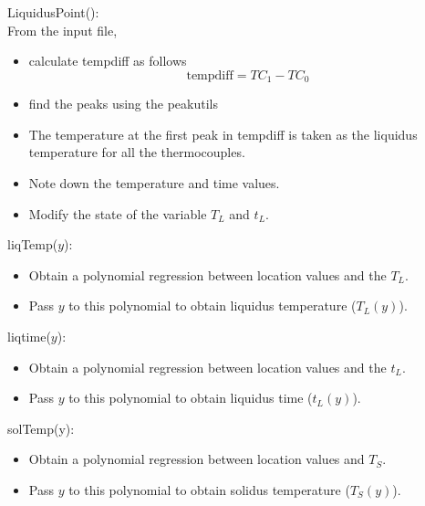 \documentclass[12pt, titlepage]{article}
\begin{document}
\noindent LiquidusPoint():\\

From the input file,        

\begin{itemize}

\item calculate tempdiff as follows
\begin{equation*}
\text{tempdiff} = TC_{1} - TC_{0} 
\end{equation*}
\item find the peaks using the peakutils

\item The temperature at the first peak in tempdiff is taken as the liquidus
  temperature for all the thermocouples. 
\item Note down the temperature and time values. 
\item Modify the state of the variable $T_L$ and $t_L$.\\

\end{itemize}

\noindent liqTemp($y$):
\begin{itemize}
\item Obtain a polynomial regression between location values and the $T_L$.\\
\item Pass $y$ to this polynomial to obtain liquidus temperature ($T_L(y)$).\\
\end{itemize}

\noindent liqtime($y$):
\begin{itemize}
\item Obtain a polynomial regression between location values and the $t_L$.\\
\item Pass $y$ to this polynomial to obtain liquidus time ($t_L(y)$).\\
\end{itemize}

\noindent solTemp(y):
\begin{itemize}
\item Obtain a polynomial regression between location values and $T_S$.\\
\item Pass $y$ to this polynomial to obtain solidus temperature ($T_S(y)$).\\
\end{itemize}
\end{document}
